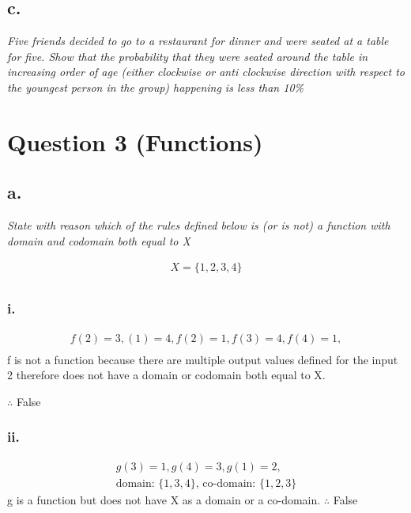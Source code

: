 \documentclass[a4paper, 12pt]{article}
\begin{document}
\subsection*{c.}
\begin{center} \textit{Five friends decided to go to a restaurant for dinner and were seated at a table for five. Show that the probability that they were seated around the table in increasing order of age (either clockwise or anti clockwise direction with respect to the youngest person in the group) happening is less than 10\%} \end{center}

\section*{Question 3 (Functions)}
\subsection*{a.}
\begin{center} \textit{State with reason which of the rules defined below is (or is not) a function with domain and codomain both equal to X} \end{center}
\begin{align*}
    X = \{1,2,3,4\} \\
\end{align*}

\subsubsection*{i.}
\begin{align*}
    f(2) = 3, (1) = 4, f(2) = 1, f(3) = 4, f(4) = 1, \\
\end{align*}
f is not a function because there are multiple output values defined for the input 2
therefore does not have a domain or codomain both equal to X. 

$\therefore$ False

\subsubsection*{ii.}
\begin{align*}
    g(3) = 1, g(4) = 3, g(1) = 2, \\
    \text{domain: } \{1,3,4\}\text{,} 
    \text{ co-domain: } \{1,2,3\} 
\end{align*}
g is a function but does not have X as a domain or a co-domain. 
$\therefore$ False
\end{document}
